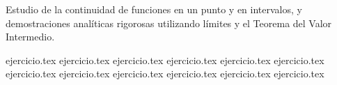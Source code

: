 
Estudio de la continuidad de funciones en un punto y en intervalos, y demostraciones analíticas rigorosas utilizando límites y el Teorema del Valor Intermedio.

\begin{enumerate}
    {ejercicio.tex}
    \setcounter{enumi}{14}
    {ejercicio.tex}
    \setcounter{enumi}{18}
    {ejercicio.tex}
    \setcounter{enumi}{22}
    {ejercicio.tex}
    {ejercicio.tex}
    {ejercicio.tex}
    \setcounter{enumi}{26}
    {ejercicio.tex}
    \setcounter{enumi}{34}
    {ejercicio.tex}
    \setcounter{enumi}{44}
    {ejercicio.tex}
    \setcounter{enumi}{47}
    {ejercicio.tex}
    \setcounter{enumi}{50}
    {ejercicio.tex}
    \setcounter{enumi}{56}
    {ejercicio.tex}
\end{enumerate}
